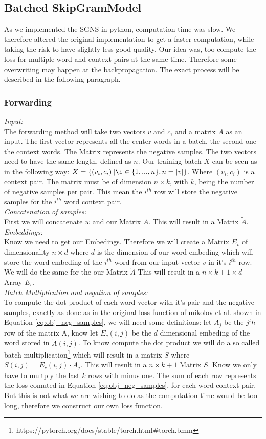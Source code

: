\subsection{Batched SkipGramModel}\label{ssec:b_SGM}
As we implemented the SGNS in python, computation time was slow. We therefore altered the original implementation to get a faster computation, while taking the risk to have slightly less good quality. Our idea was, too compute the loss for multiple word and context pairs at the same time. Therefore some overwriting may happen at the backpropagation. The exact process will be described in the following paragraph. 
\subsubsection{Forwarding}
\textit{Input:}\\
The forwarding method will take two vectors $v$ and $c$, and a matrix $A$ as an input. The first vector represents all the center words in a batch, the second one the context words. The Matrix represents the negative samples. The two vectors need to have the same length, defined as $n$. Our training batch $X$ can be seen as in the following way:  $X = \{(v_i, c_i)\|\i \in \{1, ..., n\}, n = |v| \}$. Where $(v_i,c_i)$ is a context pair. The matrix must be of dimension $n \times k$, with $k$, being the number of negative samples per pair. This mean the $i^{th}$ row will store the negative samples for the $i^{th}$ word context pair.\\
\textit{Concatenation of samples:}\\
First we will concatenate $w$ and our Matrix $A$. This will result in a Matrix $\tilde{A}$.\\
\textit{Embeddings:}\\
 Know we need to get our Embedings. Therefore we will create a Matrix $E_v$ of dimensionality $n \times d$ where $d$ is the dimension of our word embeding which will store the word embeding of the $i^{th}$ word from our input vector $v$ in it's $i^{th}$ row. We will do the same for the our Matrix $\tilde{A}$ This will result in a $n \times k+1 \times d$ Array $E_v$. \\
 \textit{Batch Multiplication and negation of samples:}\\ 
 To compute the dot product of each word vector with it's pair and the negative samples, exactly as done as in the original loss function of mikolov et al. shown in Equation \ref{eq:obj_neg_samples}, we will need some definitions: let $A_j$ be the $j^th$ row of the matrix A, know let $E_c(i,j)$ be the $d$ dimensional embeding of the word stored in $\tilde{A}(i,j)$. To know compute the dot product we will do a so called batch multiplication\footnote{https://pytorch.org/docs/stable/torch.html\#torch.bmm} which will result in a matrix $S$ where $S(i,j) = E_c(i,j) \cdot A_j$. This will result in a $n\times k+1$ Matrix $S$. Know we only have to multply the last $k$ rows with minus one. The sum of each row represents the loss comuted in Equation \ref{eq:obj_neg_samples}, for each word context pair. But this is not what we are wishing to do as the computation time would be too long, therefore we construct our own loss function. \\
